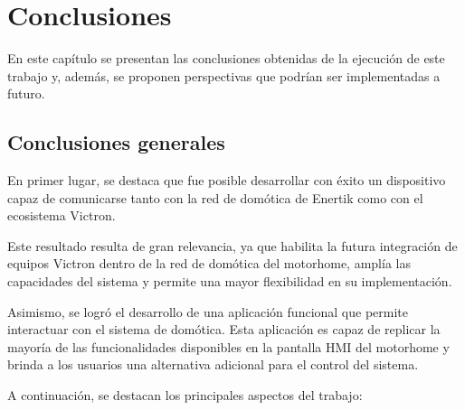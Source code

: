 
\chapter{Conclusiones} %

\label{Chapter5} %
En este capítulo se presentan las conclusiones obtenidas de la ejecución de este
trabajo y, además, se proponen perspectivas que podrían ser implementadas a
futuro.




\section{Conclusiones generales }


En primer lugar, se destaca que fue posible desarrollar con éxito un
dispositivo capaz de comunicarse tanto con la red de domótica de
Enertik como con el ecosistema Victron.

Este resultado resulta de gran relevancia, ya que habilita la futura
integración de equipos Victron dentro de la red de domótica del
motorhome, amplía las capacidades del sistema y permite una mayor
flexibilidad en su implementación.

Asimismo, se logró el desarrollo de una aplicación funcional que
permite interactuar con el sistema de domótica. Esta aplicación es
capaz de replicar la mayoría de las funcionalidades disponibles en la
pantalla HMI del motorhome y brinda a los usuarios una alternativa
adicional para el control del sistema.

A continuación, se destacan los principales aspectos del trabajo:

